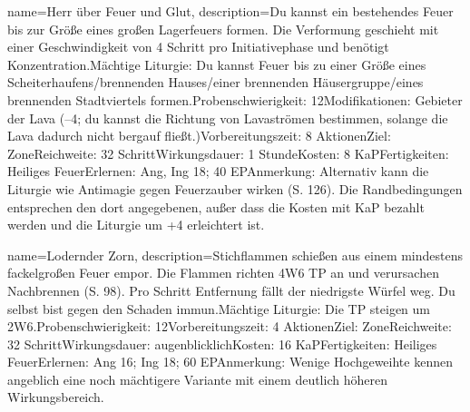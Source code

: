 {
    name={Herr über Feuer und Glut},
    description={Du kannst ein bestehendes Feuer bis zur Größe eines großen Lagerfeuers formen. Die Verformung geschieht mit einer Geschwindigkeit von 4 Schritt pro Initiativephase und benötigt Konzentration.\newline Mächtige Liturgie: Du kannst Feuer bis zu einer Größe eines Scheiterhaufens/brennenden Hauses/einer brennenden Häusergruppe/eines brennenden Stadtviertels formen.\newline Probenschwierigkeit: 12\newline Modifikationen: Gebieter der Lava (–4; du kannst die Richtung von Lavaströmen bestimmen, solange die Lava dadurch nicht bergauf fließt.)\newline Vorbereitungszeit: 8 Aktionen\newline Ziel: Zone\newline Reichweite: 32 Schritt\newline Wirkungsdauer: 1 Stunde\newline Kosten: 8 KaP\newline Fertigkeiten: Heiliges Feuer\newline Erlernen: Ang, Ing 18; 40 EP\newline Anmerkung: Alternativ kann die Liturgie wie Antimagie gegen Feuerzauber wirken (S. 126). Die Randbedingungen entsprechen den dort angegebenen, außer dass die Kosten mit KaP bezahlt werden und die Liturgie um +4 erleichtert ist.}
}


{
    name={Lodernder Zorn},
    description={Stichflammen schießen aus einem mindestens fackelgroßen Feuer empor. Die Flammen richten 4W6 TP an und verursachen Nachbrennen (S. 98). Pro Schritt Entfernung fällt der niedrigste Würfel weg. Du selbst bist gegen den Schaden immun.\newline Mächtige Liturgie: Die TP steigen um 2W6.\newline Probenschwierigkeit: 12\newline Vorbereitungszeit: 4 Aktionen\newline Ziel: Zone\newline Reichweite: 32 Schritt\newline Wirkungsdauer: augenblicklich\newline Kosten: 16 KaP\newline Fertigkeiten: Heiliges Feuer\newline Erlernen: Ang 16; Ing 18; 60 EP\newline Anmerkung: Wenige Hochgeweihte kennen angeblich eine noch mächtigere Variante mit einem deutlich höheren Wirkungsbereich.}
}


